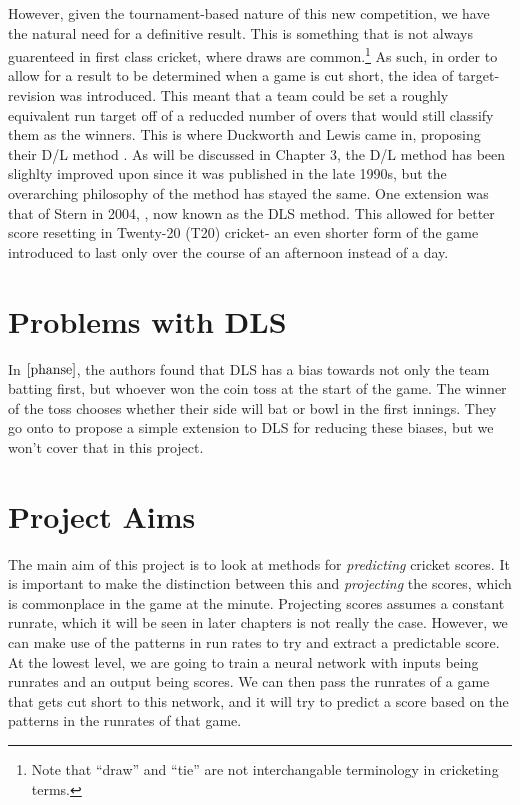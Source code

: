 However, given the tournament-based nature of this new competition, we have the natural need for a definitive result.
This is something that is not always guarenteed in first class cricket, where draws are common.\footnote{Note that 
``draw'' and ``tie'' are not interchangable terminology in cricketing terms.} As such, in order to allow for a result to be
determined when a game is cut short, the idea of target-revision was introduced. This meant that a team could be set a
roughly equivalent run target off of a reducded number of overs that would still classify them as the winners.
This is where Duckworth and Lewis came in, proposing their D/L method \cite{duckworth}. As will be discussed in Chapter 3, the D/L method 
has been slighlty improved upon since it was published in the late 1990s, but the overarching philosophy of the method has stayed the same. 
One extension was that of Stern in 2004, \cite{stern}, now  known as the DLS method. This allowed for better score resetting in Twenty-20 (T20) cricket- an even shorter 
form of the game introduced to last only over the course of an afternoon instead of a day. 

\section{Problems with DLS}
In $\cite{phanse}$, the authors found that DLS has a bias towards not only the team batting first, but whoever won the coin toss at the start of the game.
The winner of the toss chooses whether their side will bat or bowl in the first innings. They go onto to propose a simple extension to DLS for reducing
these biases, but we won't cover that in this project. 

\section{Project Aims}
The main aim of this project is to look at methods for \textit{predicting} cricket scores. It is important to make the distinction between this 
and \textit{projecting} the scores, which is commonplace in the game at the minute. Projecting scores assumes a constant runrate, which it will be seen 
in later chapters is not really the case. However, we can make use of the patterns in run rates to try and extract a predictable score. At the lowest level,
we are going to train a neural network with inputs being runrates and an output being scores. We can then pass the runrates of a game that gets cut short 
to this network, and it will try to predict a score based on the patterns in the runrates of that game.

